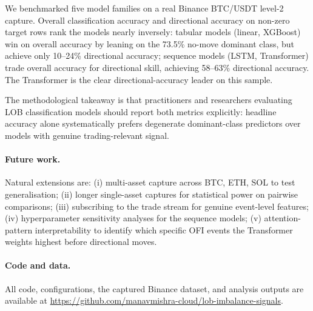 \documentclass[11pt]{article}
\begin{document}
We benchmarked five model families on a real Binance BTC/USDT level-2
capture. Overall classification accuracy and directional accuracy
on non-zero target rows rank the models nearly inversely: tabular
models (linear, XGBoost) win on overall accuracy by leaning on the
73.5\% no-move dominant class, but achieve only 10--24\% directional
accuracy; sequence models (LSTM, Transformer) trade overall accuracy
for directional skill, achieving 58--63\% directional accuracy. The
Transformer is the clear directional-accuracy leader on this sample.

The methodological takeaway is that practitioners and researchers
evaluating LOB classification models should report both metrics
explicitly: headline accuracy alone systematically prefers
degenerate dominant-class predictors over models with genuine
trading-relevant signal.

\paragraph{Future work.} Natural extensions are: (i) multi-asset
capture across BTC, ETH, SOL to test generalisation; (ii) longer
single-asset captures for statistical power on pairwise comparisons;
(iii) subscribing to the trade stream for genuine event-level
features; (iv) hyperparameter sensitivity analyses for the sequence
models; (v) attention-pattern interpretability to identify which
specific OFI events the Transformer weights highest before
directional moves.

\paragraph{Code and data.} All code, configurations, the captured
Binance dataset, and analysis outputs are available at
\url{https://github.com/manavmishra-cloud/lob-imbalance-signals}.



\end{document}
